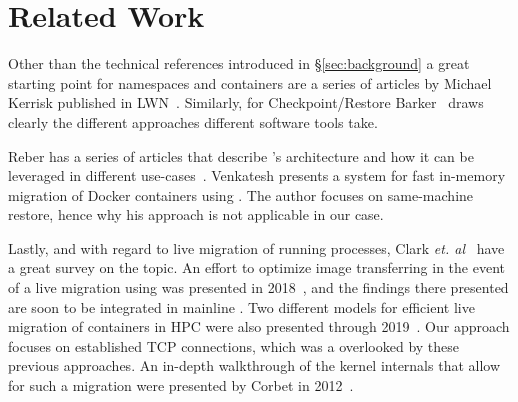 \section{Related Work} \label{sec:related}

Other than the technical references introduced in \S\ref{sec:background} a great starting point for namespaces and containers are a series of articles by Michael Kerrisk published in LWN~\cite{Kerrisk2013}.
Similarly, for Checkpoint/Restore Barker~\cite{Barker2014} draws clearly the different approaches different software tools take.

Reber has a series of articles that describe \criu's architecture and how it can be leveraged in different use-cases~\cite{Reber2016,Reber2016b,Reber2019,Reber2016b}.
Venkatesh presents a system for fast in-memory migration of Docker containers using \criu.
The author focuses on same-machine restore, hence why his approach is not applicable in our case.

Lastly, and with regard to live migration of running processes, Clark \textit{et. al}~\cite{Clark2005} have a great survey on the topic.
An effort to optimize image transferring in the event of a live migration using \criu was presented in 2018~\cite{Stoyanov2018}, and the findings there presented are soon to be integrated in mainline \criu.
Two different models for efficient live migration of containers in HPC were also presented through 2019~\cite{Sindi2019,Mavus2019}.
Our approach focuses on established TCP connections, which was a overlooked by these previous approaches.
An in-depth walkthrough of the kernel internals that allow for such a migration were presented by Corbet in 2012~\cite{Corbet12}.
